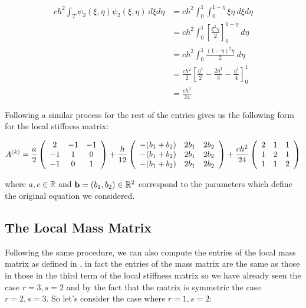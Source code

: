 \begin{align*}
    ch^2\int_T\psi_3(\xi,\eta)\psi_2(\xi,\eta)\ d\xi d\eta
    &= ch^2\int_0^1\int_0^{1-\eta}\xi\eta\ d\xi d\eta \\
    &= ch^2\int_0^1\left[\frac{\xi^2\eta}{2}\right]_0^{1-\eta}\ d\eta \\
    &= ch^2\int_0^1\frac{(1-\eta)^2\eta}{2}\ d\eta \\
    &= \frac{ch^2}{2}\left[\frac{\eta^2}{2} - \frac{2\eta^3}{3} - \frac{\eta^4}{4}\right]_0^1 \\
    &= \frac{ch^2}{24}
\end{align*}

Following a similar process for the rest of the entries gives us the following
form for the local stiffness matrix:

\begin{equation}\label{eq:twod-local-stiffness}
 A^{(k)} =
    \frac{a}{2}\left(\begin{array}{c c c}
         2 & -1 & -1 \\
        -1 &  1 &  0 \\
        -1 &  0 &  1
    \end{array}\right)
    + \frac{h}{12} \left(\begin{array}{c c c}
        -(b_1 + b_2) & 2b_1 & 2b_2 \\
        -(b_1 + b_2) & 2b_1  & 2b_2 \\
        -(b_1 + b_2) & 2b_1  & 2b_2
    \end{array}\right)
    + \frac{ch^2}{24}\left(\begin{array}{c c c}
         2 &  1 &  1 \\
         1 &  2 &  1 \\
         1 &  1 &  2
      \end{array}\right)
\end{equation}

where $a, c \in \mathbb{R}$ and $\mathbf{b} = (b_1, b_2) \in \mathbb{R}^2$
correspond to the parameters which define the original equation
 we considered.

\subsection{The Local Mass Matrix}\label{sec:twod-deterministic-local-mass}

Following the same procedure, we can also compute the entries of the local mass
matrix as defined in , in fact the
entries of the mass matrix are the same as those in those in the third term of
the local stiffness matrix so we have already seen the case $r = 3, s = 2$ and
by the fact that the matrix is symmetric the case $r = 2, s = 3$. So let's
consider the case where $r = 1, s = 2$:


